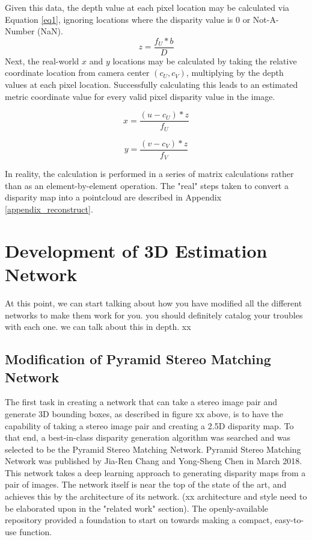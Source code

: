 Given this data, the depth value at each pixel location may be calculated via Equation \ref{eq1}, ignoring locations where the disparity value is 0 or Not-A-Number (NaN).
\begin{equation}
z = \frac{f_U * b}{D}
\label{eq1}
\end{equation}
Next, the real-world $x$ and $y$ locations may be calculated by taking the relative coordinate location from camera center $(c_U,c_V)$, multiplying by the depth values at each pixel location. Successfully calculating this leads to an estimated metric coordinate value for every valid pixel disparity value in the image.

\begin{equation}
x = \frac{(u - c_U) * z}{f_U}
\end{equation}

\begin{equation}
y = \frac{(v - c_V) * z}{f_V}
\end{equation}

In reality, the calculation is performed in a series of matrix calculations rather than as an element-by-element operation. The "real" steps taken to convert a disparity map into a pointcloud are described in Appendix \ref{appendix_reconstruct}.


\section{Development of 3D Estimation Network}
At this point, we can start talking about how you have modified all the different networks to make them work for you. you should definitely catalog your troubles with each one. we can talk about this in depth. xx

\subsection{Modification of Pyramid Stereo Matching Network}
The first task in creating a network that can take a stereo image pair and generate 3D bounding boxes, as described in figure xx above, is to have the capability of taking a stereo image pair and creating a 2.5D disparity map. To that end, a best-in-class disparity generation algorithm was searched and was selected to be the Pyramid Stereo Matching Network. Pyramid Stereo Matching Network was published by Jia-Ren Chang and Yong-Sheng Chen in March 2018. This network takes a deep learning approach to generating disparity maps from a pair of images. The network itself is near the top of the state of the art, and achieves this by the architecture of its network. (xx architecture and style need to be elaborated upon in the "related work" section). The openly-available repository provided a foundation to start on towards making a compact, easy-to-use function.

